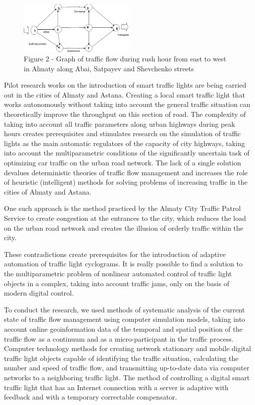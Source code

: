 \begin{figure}[H]
	\centering
	\includegraphics[width=0.5\textwidth]{assets/74}
	\caption*{Figure 2 - Graph of traffic flow during rush hour from east to west in Almaty along Abai, Satpayev and Shevchenko streets}
\end{figure}

\begin{multicols}{2}
Pilot research works on the introduction of smart traffic lights are
being carried out in the cities of Almaty and Astana. Creating a local
smart traffic light that works autonomously without taking into account
the general traffic situation can theoretically improve the throughput
on this section of road. The complexity of taking into account all
traffic parameters along urban highways during peak hours creates
prerequisites and stimulates research on the simulation of traffic
lights as the main automatic regulators of the capacity of city
highways, taking into account the multiparametric conditions of the
significantly uncertain task of optimizing car traffic on the urban road
network. The lack of a single solution devalues deterministic theories
of traffic flow management and increases the role of heuristic
(intelligent) methods for solving problems of increasing traffic in the
cities of Almaty and Astana.

One such approach is the method practiced by the Almaty City Traffic
Patrol Service to create congestion at the entrances to the city, which
reduces the load on the urban road network and creates the illusion of
orderly traffic within the city.

These contradictions create prerequisites for the introduction of
adaptive automation of traffic light cyclograms. It is really possible
to find a solution to the multiparametric problem of nonlinear automated
control of traffic light objects in a complex, taking into account
traffic jams, only on the basis of modern digital control.

To conduct the research, we used methods of systematic analysis of the
current state of traffic flow management using computer simulation
models, taking into account online geoinformation data of the temporal
and spatial position of the traffic flow as a continuum and as a
micro-participant in the traffic process. Computer technology methods
for creating network stationary and mobile digital traffic light objects
capable of identifying the traffic situation, calculating the number and
speed of traffic flow, and transmitting up-to-date data via computer
networks to a neighboring traffic light. The method of controlling a
digital smart traffic light that has an Internet connection with a
server is adaptive with feedback and with a temporary correctable
compensator.


\end{multicols}
